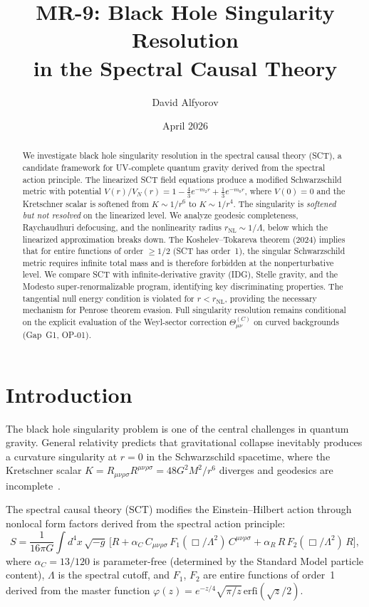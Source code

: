 \documentclass[11pt,a4paper]{article}
\title{MR-9: Black Hole Singularity Resolution\\in the Spectral Causal Theory}
\author{David Alfyorov}
\date{April 2026}
\theoremstyle{definition}
\theoremstyle{remark}
\newcommand{\Lam}{\Lambda}
\newcommand{\rNL}{r_{\mathrm{NL}}}
\begin{document}
\maketitle

\begin{abstract}
We investigate black hole singularity resolution in the spectral causal theory (SCT),
a candidate framework for UV-complete quantum gravity derived from the spectral action
principle. The linearized SCT field equations produce a modified Schwarzschild metric
with potential $V(r)/V_N(r) = 1 - \tfrac{4}{3}e^{-m_2 r} + \tfrac{1}{3}e^{-m_0 r}$,
where $V(0) = 0$ and the Kretschner scalar is softened from $K \sim 1/r^6$ to $K \sim 1/r^4$.
The singularity is \emph{softened but not resolved} on the linearized level.
We analyze geodesic completeness, Raychaudhuri defocusing, and the nonlinearity radius
$\rNL \sim 1/\Lam$, below which the linearized approximation breaks down.
The Koshelev--Tokareva theorem (2024) implies that for entire functions of order $\geq 1/2$
(SCT has order~1), the singular Schwarzschild metric requires infinite total mass and
is therefore forbidden at the nonperturbative level.
We compare SCT with infinite-derivative gravity (IDG), Stelle gravity, and the
Modesto super-renormalizable program, identifying key discriminating properties.
The tangential null energy condition is violated for $r < \rNL$, providing the
necessary mechanism for Penrose theorem evasion.
Full singularity resolution remains conditional on the explicit evaluation of the
Weyl-sector correction $\Theta^{(C)}_{\mu\nu}$ on curved backgrounds (Gap~G1, OP-01).
\end{abstract}

\tableofcontents

\section{Introduction}

The black hole singularity problem is one of the central challenges in quantum gravity.
General relativity predicts that gravitational collapse inevitably produces a curvature
singularity at $r = 0$ in the Schwarzschild spacetime, where the Kretschner scalar
$K = R_{\mu\nu\rho\sigma}R^{\mu\nu\rho\sigma} = 48G^2M^2/r^6$ diverges and geodesics
are incomplete~\cite{Penrose1965,HawkingPenrose1970}.

The spectral causal theory (SCT) modifies the Einstein--Hilbert action through nonlocal
form factors derived from the spectral action principle:
\begin{equation}\label{eq:action}
  S = \frac{1}{16\pi G}\int d^4x\,\sqrt{-g}\,
  \bigl[R + \alpha_C\, C_{\mu\nu\rho\sigma}\, F_1(\Box/\Lam^2)\, C^{\mu\nu\rho\sigma}
  + \alpha_R\, R\, F_2(\Box/\Lam^2)\, R\bigr],
\end{equation}
where $\alpha_C = 13/120$ is parameter-free (determined by the Standard Model particle
content), $\Lam$ is the spectral cutoff, and $F_1$, $F_2$ are entire functions of order~1
derived from the master function $\varphi(z) = e^{-z/4}\sqrt{\pi/z}\,\mathrm{erfi}(\sqrt{z}/2)$.
\end{document}
